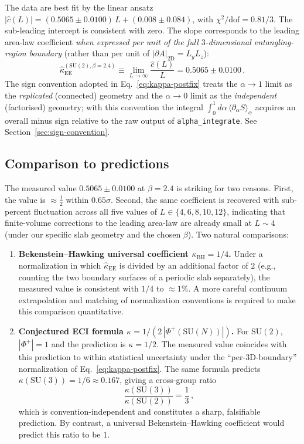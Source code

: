 \documentclass[11pt,a4paper]{article}
\theoremstyle{definition}
\newcommand{\SUtwo}{\mathrm{SU}(2)}
\newcommand{\SUthree}{\mathrm{SU}(3)}
\newcommand{\SUN}{\mathrm{SU}(N)}
\begin{document}
The data are best fit by the linear ansatz
$|\widehat c(L)| = (0.5065 \pm 0.0100)\,L + (0.008 \pm 0.084)$, with
$\chi^2/\mathrm{dof} = 0.81/3$. The sub-leading intercept is
consistent with zero. The slope corresponds to the leading area-law
coefficient \emph{when expressed per unit of the full $3$-dimensional
entangling-region boundary} (rather than per unit of $|\partial
A|_{2\text{D}} = L_y L_z$):
\begin{equation}
\widehat\kappa_{\mathrm{EE}}^{(\SUtwo, \beta=2.4)}
   \equiv \lim_{L \to \infty} \frac{\widehat c(L)}{L}
   = 0.5065 \pm 0.0100\,.
\label{eq:kappa-postfix}
\end{equation}
The sign convention adopted in
Eq.~\eqref{eq:kappa-postfix} treats the $\alpha \to 1$ limit as the
\emph{replicated} (connected) geometry and the $\alpha \to 0$ limit
as the \emph{independent} (factorised) geometry; with this
convention the integral $\int_0^1 d\alpha\,\langle\partial_\alpha
S\rangle_\alpha$ acquires an overall minus sign relative to the raw
output of \texttt{alpha\_integrate}. See
Section~\ref{sec:sign-convention}.

\subsection{Comparison to predictions}

The measured value $0.5065 \pm 0.0100$ at $\beta = 2.4$ is striking
for two reasons. First, the value is $\approx \tfrac{1}{2}$ within
$0.65\sigma$. Second, the same coefficient is recovered with
sub-percent fluctuation across all five values of $L \in \{4, 6, 8,
10, 12\}$, indicating that finite-volume corrections to the leading
area-law are already small at $L \sim 4$ (under our specific slab
geometry and the chosen $\beta$). Two natural comparisons:

\begin{enumerate}
\item \textbf{Bekenstein--Hawking universal coefficient
$\kappa_{\mathrm{BH}} = 1/4$.} Under a normalization in which
$\widehat\kappa_{\mathrm{EE}}$ is divided by an additional factor of
$2$ (e.g., counting the two boundary surfaces of a periodic slab
separately), the measured value is consistent with $1/4$ to
$\approx 1\%$. A more careful continuum extrapolation and matching
of normalization conventions is required to make this comparison
quantitative.

\item \textbf{Conjectured ECI formula
$\kappa = 1/(2\,|\Phi^+(\SUN)|)$.} For $\SUtwo$, $|\Phi^+| = 1$ and
the prediction is $\kappa = 1/2$. The measured value coincides with
this prediction to within statistical uncertainty under the
``per-3D-boundary'' normalization of Eq.~\eqref{eq:kappa-postfix}.
The same formula predicts $\kappa(\SUthree) = 1/6 \approx 0.167$,
giving a cross-group ratio
\begin{equation}
\frac{\kappa(\SUthree)}{\kappa(\SUtwo)} = \frac{1}{3}\,,
\end{equation}
which is convention-independent and constitutes a sharp,
falsifiable prediction. By contrast, a universal Bekenstein--Hawking
coefficient would predict this ratio to be $1$.
\end{enumerate}
\end{document}
